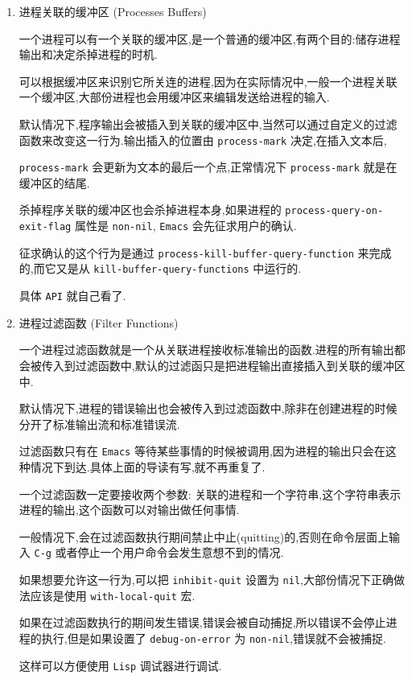 \documentclass[11pt]{article}
\begin{document}
\begin{enumerate}
\item 进程关联的缓冲区 (Processes Buffers)
\label{sec:org7afcb84}

一个进程可以有一个关联的缓冲区,是一个普通的缓冲区,有两个目的:储存进程输出和决定杀掉进程的时机.

可以根据缓冲区来识别它所关连的进程,因为在实际情况中,一般一个进程关联一个缓冲区,大部份进程也会用缓冲区来编辑发送给进程的输入.

默认情况下,程序输出会被插入到关联的缓冲区中,当然可以通过自定义的过滤函数来改变这一行为.输出插入的位置由 \texttt{process-mark} 决定,在插入文本后,

\texttt{process-mark} 会更新为文本的最后一个点,正常情况下 \texttt{process-mark} 就是在缓冲区的结尾.

杀掉程序关联的缓冲区也会杀掉进程本身,如果进程的 \texttt{process-query-on-exit-flag} 属性是 \texttt{non-nil}, \texttt{Emacs} 会先征求用户的确认.

征求确认的这个行为是通过 \texttt{process-kill-buffer-query-function} 来完成的,而它又是从 \texttt{kill-buffer-query-functions} 中运行的.

具体 \texttt{API} 就自己看了.


\item 进程过滤函数 (Filter Functions)
\label{sec:orgba911aa}

一个进程过滤函数就是一个从关联进程接收标准输出的函数.进程的所有输出都会被传入到过滤函数中,默认的过滤函只是把进程输出直接插入到关联的缓冲区中.

默认情况下,进程的错误输出也会被传入到过滤函数中,除非在创建进程的时候分开了标准输出流和标准错误流.

过滤函数只有在 \texttt{Emacs} 等待某些事情的时候被调用,因为进程的输出只会在这种情况下到达.具体上面的导读有写,就不再重复了.

一个过滤函数一定要接收两个参数: 关联的进程和一个字符串,这个字符串表示进程的输出,这个函数可以对输出做任何事情.

一般情况下,会在过滤函数执行期间禁止中止(quitting)的,否则在命令层面上输入 \texttt{C-g} 或者停止一个用户命令会发生意想不到的情况.

如果想要允许这一行为,可以把 \texttt{inhibit-quit} 设置为 \texttt{nil},大部份情况下正确做法应该是使用 \texttt{with-local-quit} 宏.

如果在过滤函数执行的期间发生错误,错误会被自动捕捉,所以错误不会停止进程的执行,但是如果设置了 \texttt{debug-on-error} 为 \texttt{non-nil},错误就不会被捕捉.

这样可以方便使用 \texttt{Lisp} 调试器进行调试.


\end{enumerate}
\end{document}
